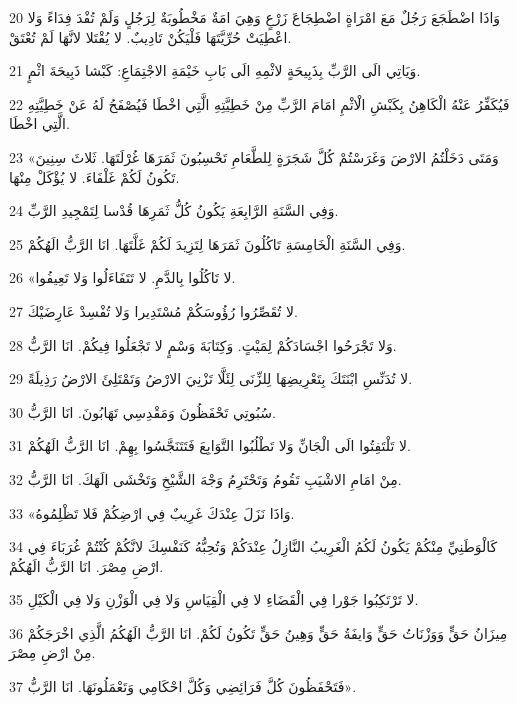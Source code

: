 \par 20 وَاذَا اضْطَجَعَ رَجُلٌ مَعَ امْرَاةٍ اضْطِجَاعَ زَرْعٍ وَهِيَ امَةٌ مَخْطُوبَةٌ لِرَجُلٍ وَلَمْ تُفْدَ فِدَاءً وَلا اعْطِيَتْ حُرِّيَّتَهَا فَلْيَكُنْ تَادِيبٌ. لا يُقْتَلا لانَّهَا لَمْ تُعْتَقْ.
\par 21 وَيَاتِي الَى الرَّبِّ بِذَبِيحَةٍ لاثْمِهِ الَى بَابِ خَيْمَةِ الاجْتِمَاعِ: كَبْشا ذَبِيحَةَ اثْمٍ.
\par 22 فَيُكَفِّرُ عَنْهُ الْكَاهِنُ بِكَبْشِ الْاثْمِ امَامَ الرَّبِّ مِنْ خَطِيَّتِهِ الَّتِي اخْطَا فَيُصْفَحُ لَهُ عَنْ خَطِيَّتِهِ الَّتِي اخْطَا.
\par 23 «وَمَتَى دَخَلْتُمُ الارْضَ وَغَرَسْتُمْ كُلَّ شَجَرَةٍ لِلطَّعَامِ تَحْسِبُونَ ثَمَرَهَا غُرْلَتَهَا. ثَلاثَ سِنِينَ تَكُونُ لَكُمْ غَلْفَاءَ. لا يُؤْكَلْ مِنْهَا.
\par 24 وَفِي السَّنَةِ الرَّابِعَةِ يَكُونُ كُلُّ ثَمَرِهَا قُدْسا لِتَمْجِيدِ الرَّبِّ.
\par 25 وَفِي السَّنَةِ الْخَامِسَةِ تَاكُلُونَ ثَمَرَهَا لِتَزِيدَ لَكُمْ غَلَّتَهَا. انَا الرَّبُّ الَهُكُمْ.
\par 26 «لا تَاكُلُوا بِالدَّمِ. لا تَتَفَاءَلُوا وَلا تَعِيفُوا.
\par 27 لا تُقَصِّرُوا رُؤُوسَكُمْ مُسْتَدِيرا وَلا تُفْسِدْ عَارِضَيْكَ.
\par 28 وَلا تَجْرَحُوا اجْسَادَكُمْ لِمَيْتٍ. وَكِتَابَةَ وَسْمٍ لا تَجْعَلُوا فِيكُمْ. انَا الرَّبُّ.
\par 29 لا تُدَنِّسِ ابْنَتَكَ بِتَعْرِيضِهَا لِلزِّنَى لِئَلَّا تَزْنِيَ الارْضُ وَتَمْتَلِئَ الارْضُ رَذِيلَةً.
\par 30 سُبُوتِي تَحْفَظُونَ وَمَقْدِسِي تَهَابُونَ. انَا الرَّبُّ.
\par 31 لا تَلْتَفِتُوا الَى الْجَانِّ وَلا تَطْلُبُوا التَّوَابِعَ فَتَتَنَجَّسُوا بِهِمْ. انَا الرَّبُّ الَهُكُمْ.
\par 32 مِنْ امَامِ الاشْيَبِ تَقُومُ وَتَحْتَرِمُ وَجْهَ الشَّيْخِ وَتَخْشَى الَهَكَ. انَا الرَّبُّ.
\par 33 «وَاذَا نَزَلَ عِنْدَكَ غَرِيبٌ فِي ارْضِكُمْ فَلا تَظْلِمُوهُ.
\par 34 كَالْوَطَنِيِّ مِنْكُمْ يَكُونُ لَكُمُ الْغَرِيبُ النَّازِلُ عِنْدَكُمْ وَتُحِبُّهُ كَنَفْسِكَ لانَّكُمْ كُنْتُمْ غُرَبَاءَ فِي ارْضِ مِصْرَ. انَا الرَّبُّ الَهُكُمْ.
\par 35 لا تَرْتَكِبُوا جَوْرا فِي الْقَضَاءِ لا فِي الْقِيَاسِ وَلا فِي الْوَزْنِ وَلا فِي الْكَيْلِ.
\par 36 مِيزَانُ حَقٍّ وَوَزْنَاتُ حَقٍّ وَايفَةُ حَقٍّ وَهِينُ حَقٍّ تَكُونُ لَكُمْ. انَا الرَّبُّ الَهُكُمُ الَّذِي اخْرَجَكُمْ مِنْ ارْضِ مِصْرَ.
\par 37 فَتَحْفَظُونَ كُلَّ فَرَائِضِي وَكُلَّ احْكَامِي وَتَعْمَلُونَهَا. انَا الرَّبُّ».

